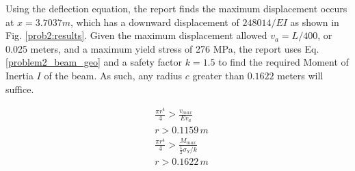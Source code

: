 \documentclass[a4paper]{article}
\begin{document}
Using the deflection equation, the report finds the maximum displacement occurs at $x = 3.7037 m$, which has a downward displacement of $248014/EI$ as shown in Fig. \ref{prob2:results}. Given the maximum displacement allowed $v_a = L/400$, or 0.025 meters, and a maximum yield stress of 276 MPa, the report uses Eq. \ref{problem2_beam_geo} and a safety factor $k=1.5$ to find the required Moment of Inertia $I$ of the beam. As such, any radius $c$ greater than $0.1622$ meters will suffice.


\begin{equation}
\begin{split}
& \frac{\pi r^4}{4} > \frac{v_{max}}{Ev_a} \\
& r > 0.1159\,m \\
& \frac{\pi r^4}{4} > \frac{M_{max}}{\frac{1}{2}\sigma_Y/ k}\\
& r > 0.1622\,m \\
\end{split}
\label{problem2_beam_geo}
\end{equation}
\end{document}
